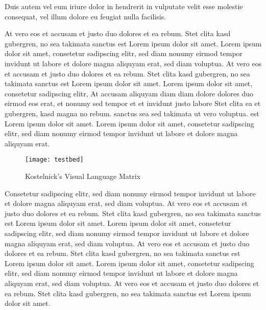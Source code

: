 Duis autem vel eum iriure dolor in hendrerit in vulputate velit esse molestie
consequat, vel illum dolore eu feugiat nulla facilisis.

At vero eos et accusam et justo duo dolores et ea rebum. Stet clita kasd
gubergren, no sea takimata sanctus est Lorem ipsum dolor sit amet. Lorem ipsum
dolor sit amet, consetetur sadipscing elitr,  sed diam nonumy eirmod tempor
invidunt ut labore et dolore magna aliquyam erat, sed diam voluptua. At vero
eos et accusam et justo duo dolores et ea rebum. Stet clita kasd gubergren, no
sea takimata sanctus est Lorem ipsum dolor sit amet. Lorem ipsum dolor sit
amet, consetetur sadipscing elitr,  At accusam aliquyam diam diam dolore
dolores duo eirmod eos erat, et nonumy sed tempor et et invidunt justo labore
Stet clita ea et gubergren, kasd magna no rebum. sanctus sea sed takimata ut
vero voluptua. est Lorem ipsum dolor sit amet. Lorem ipsum dolor sit amet,
consetetur sadipscing elitr,  sed diam nonumy eirmod tempor invidunt ut labore
et dolore magna aliquyam erat. 

\begin{figure}
\begin{center}
\texttt{[image: testbed]}
\caption{Kostelnick's Visual Language Matrix}
\end{center}
\end{figure}

Consetetur sadipscing elitr,  sed diam nonumy eirmod tempor invidunt ut labore
et dolore magna aliquyam erat, sed diam voluptua. At vero eos et accusam et
justo duo dolores et ea rebum. Stet clita kasd gubergren, no sea takimata
sanctus est Lorem ipsum dolor sit amet. Lorem ipsum dolor sit amet, consetetur
sadipscing elitr,  sed diam nonumy eirmod tempor invidunt ut labore et dolore
magna aliquyam erat, sed diam voluptua. At vero eos et accusam et justo duo
dolores et ea rebum. Stet clita kasd gubergren, no sea takimata sanctus est
Lorem ipsum dolor sit amet. Lorem ipsum dolor sit amet, consetetur sadipscing
elitr,  sed diam nonumy eirmod tempor invidunt ut labore et dolore magna
aliquyam erat, sed diam voluptua. At vero eos et accusam et justo duo dolores
et ea rebum. Stet clita kasd gubergren, no sea takimata sanctus est Lorem ipsum
dolor sit amet.

